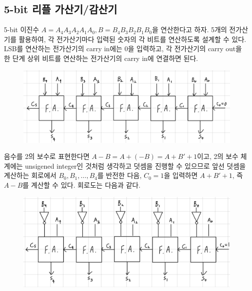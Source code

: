 \documentclass{scrartcl}
\begin{document}
\subsection{5-bit 리플 가산기/감산기}
5-bit 이진수 \(A = A_4 A_3 A_2 A_1 A_0, B = B_4 B_3 B_2 B_1 B_0\)을 연산한다고 하자.
5개의 전가산기를 활용하여, 각 전가산기마다 입력된 숫자의 각 비트를 연산하도록 설계할 수 있다.
LSB를 연산하는 전가산기의 carry in에는 0을 입력하고, 각 전가산기의 carry out을 한 단계 상위 비트를 연산하는 전가산기의 carry in에 연결하면 된다.
\begin{figure}[H]
  \centering
  \includegraphics[width=0.8\linewidth]{ripple-carry-adder.jpeg}
\end{figure}
음수를 2의 보수로 표현한다면 \(A - B = A + (-B) = A + B' + 1\)이고, 2의 보수 체계에는 unsigened integer인 것처럼 생각하고 덧셈을 진행할 수 있으므로 앞선 덧셈을 계산하는 회로에서 \(B_0, B_1, \dots, B_4\)를 반전한 다음, \(C_0 = 1\)을 입력하면 \(A + B' + 1\), 즉 \(A - B\)를 계산할 수 있다.
회로도는 다음과 같다.
\begin{figure}[H]
  \centering
  \includegraphics[width=0.8\linewidth]{ripple-carry-subtractor.jpeg}
\end{figure}
\end{document}
